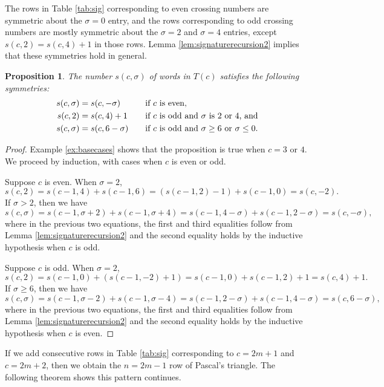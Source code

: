 \documentclass[12pt]{amsart}
\newtheorem{proposition}[theorem]{Proposition}
\theoremstyle{definition}
\theoremstyle{remark}
\numberwithin{equation}{section}
\begin{document}
The rows in Table \ref{tab:sig} corresponding to even crossing numbers are symmetric about the $\sigma=0$ entry, and the rows corresponding to odd crossing numbers are mostly symmetric about the $\sigma=2$ and $\sigma=4$ entries, except $s(c,2)=s(c,4)+1$ in those rows. Lemma \ref{lem:signaturerecursion2} implies that these symmetries hold in general.

\begin{proposition}
\label{prop:sym}
    The number $s(c,\sigma)$ of words in $T(c)$ satisfies the following symmetries:
    \begin{alignat*}{3}
        s(c,\sigma) = & \; s(c,-\sigma) & \quad &\text{if $c$ is even,}\\
    s(c,2) = & \; s(c,4)+1 & \quad & \text{if $c$ is odd and $\sigma$ is 2 or 4, and}\\
        s(c,\sigma)  = & \;   s(c,6-\sigma)& \quad & \text{if $c$ is odd and $\sigma\geq 6$~\text{or}~$\sigma\leq0$.}    
    \end{alignat*}
\end{proposition}



\begin{proof}
    Example \ref{ex:basecases} shows that the proposition is true when $c=3$ or $4$. We proceed by induction, with cases when $c$ is even or odd.
    
    Suppose $c$ is even. When $\sigma=2$,
    \[s(c,2) =  s(c-1,4)+s(c-1,6) =  (s(c-1,2)-1)+s(c-1,0) = s(c,-2).\]
    If $\sigma>2$, then we have
    \[s(c,\sigma) =  s(c-1,\sigma+2)+s(c-1,\sigma+4) =   s(c-1,4-\sigma)+s(c-1,2-\sigma) =   s(c,-\sigma),\]
    where in the previous two equations, the first and third equalities follow from Lemma \ref{lem:signaturerecursion2} and the second equality holds by the inductive hypothesis when $c$ is odd. 

    Suppose $c$ is odd. When $\sigma=2$,
   \[s(c,2)  =  s(c-1,0) + (s(c-1,-2) + 1)  =  s(c-1,0) + s(c-1,2) + 1  =  s(c,4) + 1.\]    
    If $\sigma \geq 6$, then we have
   \[
    s(c,\sigma)  =  s(c-1,\sigma-2) + s(c-1,\sigma-4)  =  s(c-1,2-\sigma) + s(c-1,4-\sigma)  =  s(c,6-\sigma),\]   
     where in the previous two equations, the first and third equalities follow from Lemma \ref{lem:signaturerecursion2} and the second equality holds by the inductive hypothesis when $c$ is even. 
\end{proof}

If we add consecutive rows in Table \ref{tab:sig} corresponding to $c=2m+1$ and $c=2m+2$, then we obtain the $n=2m-1$ row of Pascal's triangle. The following theorem shows this pattern continues.
\end{document}
